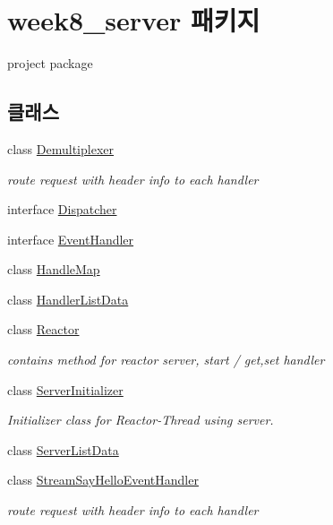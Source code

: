 \hypertarget{namespaceweek8__server}{\section{week8\-\_\-server 패키지}
\label{namespaceweek8__server}
}


project package  


\subsection*{클래스}
\begin{DoxyCompactItemize}
\item 
class \hyperlink{classweek8__server_1_1_demultiplexer}{Demultiplexer}
\begin{DoxyCompactList}\small\item\em route request with header info to each handler \end{DoxyCompactList}\item 
interface \hyperlink{interfaceweek8__server_1_1_dispatcher}{Dispatcher}
\item 
interface \hyperlink{interfaceweek8__server_1_1_event_handler}{Event\-Handler}
\item 
class \hyperlink{classweek8__server_1_1_handle_map}{Handle\-Map}
\item 
class \hyperlink{classweek8__server_1_1_handler_list_data}{Handler\-List\-Data}
\item 
class \hyperlink{classweek8__server_1_1_reactor}{Reactor}
\begin{DoxyCompactList}\small\item\em contains method for reactor server, start / get,set handler \end{DoxyCompactList}\item 
class \hyperlink{classweek8__server_1_1_server_initializer}{Server\-Initializer}
\begin{DoxyCompactList}\small\item\em Initializer class for Reactor-\/\-Thread using server. \end{DoxyCompactList}\item 
class \hyperlink{classweek8__server_1_1_server_list_data}{Server\-List\-Data}
\item 
class \hyperlink{classweek8__server_1_1_stream_say_hello_event_handler}{Stream\-Say\-Hello\-Event\-Handler}
\begin{DoxyCompactList}\small\item\em route request with header info to each handler \end{DoxyCompactList}\item 

\end{DoxyCompactItemize}
